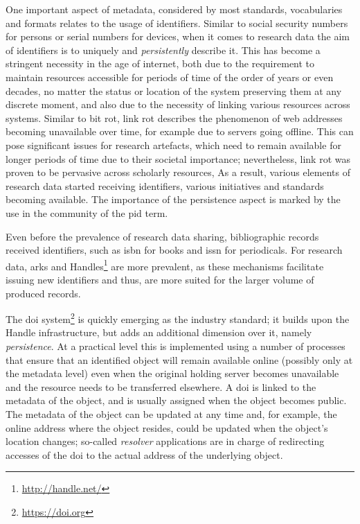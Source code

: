 One important aspect of metadata, considered by most standards, vocabularies and formats relates to the usage of identifiers. Similar to social security numbers for persons or serial numbers for devices, when it comes to research data the aim of identifiers is to uniquely and \emph{persistently} describe it. This has become a stringent necessity in the age of internet, both due to the requirement to maintain resources accessible for periods of time of the order of years or even decades, no matter the status or location of the system preserving them at any discrete moment, and also due to the necessity of linking various resources across systems. Similar to bit rot, link rot describes the phenomenon of web addresses becoming unavailable over time, for example due to servers going offline. This can pose significant issues for research artefacts, which need to remain available for longer periods of time due to their societal importance; nevertheless, link rot was proven to be pervasive across scholarly resources\cite{sanderson}, As a result, various elements of research data started receiving identifiers, various initiatives and standards becoming available. The importance of the persistence aspect is marked by the use in the community of the \gls{pid} term.

Even before the prevalence of research data sharing, bibliographic records received identifiers, such as \gls{isbn} for books and \gls{issn} for periodicals. For research data, \glspl{ark} and Handles\footnote{\url{http://handle.net/}} are more prevalent, as these mechanisms facilitate issuing new identifiers and thus, are more suited for the larger volume of produced records.

The \gls{doi} system\footnote{\url{https://doi.org}} is quickly emerging as the industry standard; it builds upon the Handle infrastructure, but adds an additional dimension over it, namely \emph{persistence}\cite{doihandle}. At a practical level this is implemented using a number of processes that ensure that an identified object will remain available online (possibly only at the metadata level) even when the original holding server becomes unavailable and the resource needs to be transferred elsewhere. A \gls{doi} is linked to the metadata of the object, and is usually assigned when the object becomes public. The metadata of the object can be updated at any time and, for example, the online address where the object resides, could be updated when the object's location changes; so-called \emph{resolver} applications are in charge of redirecting accesses of the \gls{doi} to the actual address of the underlying object.

